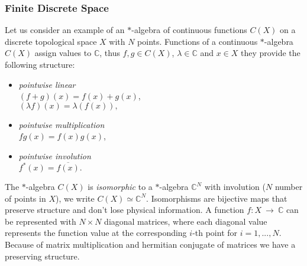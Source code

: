 \subsubsection{Finite Discrete Space}
Let us consider an example of an $*$-algebra of continuous functions $C(X)$
on a discrete topological space $X$ with $N$ points. Functions of a
continuous $*$-algebra $C(X)$ assign values to $\mathbb{C}$, thus $f, g \in
C(X)$, $\lambda \in \mathbb{C}$ and $x \in X$ they provide the following structure:
\begin{itemize}
    \item \textit{pointwise linear} \\
      $(f + g)(x) = f(x) + g(x)$,\\
      $(\lambda f)(x) = \lambda (f(x)),$
    \item \textit{pointwise multiplication} \\
        $fg(x) = f(x)g(x)$,
    \item \textit{pointwise involution} \\
        $f^*(x) = \overline{f(x)}.$
\end{itemize}
The $*$-algebra $C(X)$ is \textit{isomorphic} to a $*$-algebra $\mathbb{C}^N$
with involution ($N$ number of points in $X$), we write $C(X) \simeq
\mathbb{C}^N$.  Isomorphisms are bijective maps that preserve structure and
don't lose physical information.  A function $f:X\ \rightarrow\ \mathbb{C}$
can be represented with $N \times N$ diagonal matrices, where each diagonal
value represents the function value at the corresponding $i$-th point for $i
= 1,...,N$. Because of matrix multiplication and hermitian conjugate of
matrices we have a preserving structure.

